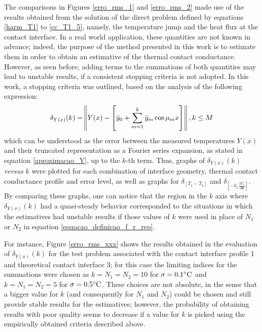\documentclass[12pt]{CHT-20}
\begin{document}
The comparisons in Figures \ref{erro_rms_1} and \ref{erro_rms_2} made use of the results obtained from the solution of the direct problem defined by equations \eqref{harm_T1} to \eqref{cc_T1_5}, namely, the temperature jump and the heat flux at the contact interface. In a real world application, these quantities are not known in advance; indeed, the purpose of the method presented in this work is to estimate them in order to obtain an estimative of the thermal contact conductance. However, as seen before, adding terms to the summations of both quantities may lead to unstable results, if a consistent stopping criteria is not adopted. In this work, a stopping criteria was outlined, based on the analysis of the following expression:
\begin{align}
\delta_{Y(x)}(k) = \norm{Y(x) - \left[\bar{y}_0 + \sum_{m=1}^k \bar{y}_m \cos\mu_m x \right]} , k \le M \label{aproximacao_Y_2}
\end{align}
which can be understood as the error between the measured temperatures $Y(x)$ and their truncated representation as a Fourier series expansion, as stated in equation \eqref{aproximacao_Y}, up to the $k$-th term. Thus, graphs of $\delta_{Y(x)}(k)$ \textit{versus} $k$ were plotted for each combination of interface geometry, thermal contact conductance profile and error level, as well as graphs for $\delta_{[T_1 - T_2]}$ and $\delta_{\left[-k_1 \frac{\partial T_1}{\partial \mathbf{n}}\right]}$. By comparing these graphs, one can notice that the region in the $k$ axis where $\delta_{Y(x)}(k)$ had a quasi-steady behavior corresponded to the situations in which the estimatives had unstable results if those values of $k$ were used in place of $N_1$ or $N_2$ in equation \eqref{equacao_definicao_f_r_rep}. 

For instance, Figure \ref{erro_rms_xxx} shows the results obtained in the evaluation of $\delta_{Y(x)}(k)$ for the test problem associated with the contact interface profile 1 and theoretical contact interface 3; for this case the limiting indices for the summations were chosen as $k=N_1=N_2=10$ for $\sigma = 0.1\celsius$ and $k=N_1=N_2=5$ for $\sigma = 0.5\celsius$. These choices are not absolute, in the sense that a bigger value for $k$ (and consequently for $N_1$ and $N_2$) could be chosen and still provide stable results for the estimatives; however, the probability of obtaining results with poor quality seems to decrease if a value for $k$ is picked using the empirically obtained criteria described above.
\end{document}
